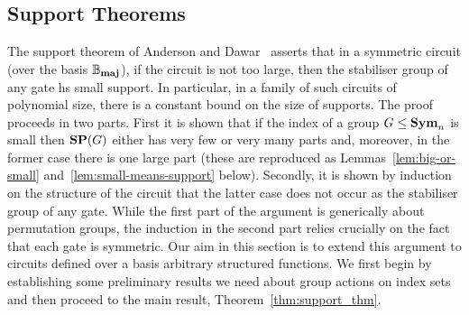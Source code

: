 \documentclass[../paper.tex]{subfiles}
\begin{document}
\subsection{Support Theorems}
The support theorem of Anderson and Dawar~\cite{AndersonD17} asserts that in a
symmetric circuit (over the basis $\mathbb{B}_{\text{\textbf{maj}}}$), if the circuit is not
too large, then the stabiliser group of any gate hs small support. In
particular, in a family of such circuits of polynomial size, there is a constant
bound on the size of supports. The proof proceeds in two parts. First it is
shown that if the index of a group $G \leq \text{\textbf{Sym}}_n$ is small then $\text{\textbf{SP}}(G)$ either
has very few or very many parts and, moreover, in the former case there is one
large part (these are reproduced as Lemmas~\ref{lem:big-or-small}
and~\ref{lem:small-means-support} below). Secondly, it is shown by induction on
the structure of the circuit that the latter case does not occur as the
stabiliser group of any gate. While the first part of the argument is
generically about permutation groups, the induction in the second part relies
crucially on the fact that each gate is symmetric. Our aim in this section is to
extend this argument to circuits defined over a basis arbitrary structured
functions. We first begin by establishing some preliminary results we need about
group actions on index sets and then proceed to the main result,
Theorem~\ref{thm:support_thm}.





\end{document}
